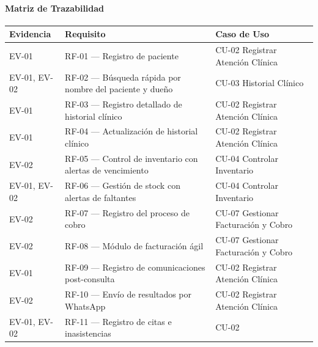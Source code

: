 \documentclass[
]{article}
\newcounter{none} %
\begin{document}
\paragraph{Matriz de Trazabilidad}\label{matriz-de-trazabilidad-1}

{\def\LTcaptype{none} %
\begin{longtable}[]{@{}
  >{\raggedright\arraybackslash}p{}
  >{\raggedright\arraybackslash}p{}
  >{\raggedright\arraybackslash}p{}@{}}
\toprule\noalign{}
\begin{minipage}[b]{\linewidth}\raggedright
\textbf{Evidencia}
\end{minipage} & \begin{minipage}[b]{\linewidth}\centering
\textbf{Requisito}
\end{minipage} & \begin{minipage}[b]{\linewidth}\raggedright
\textbf{Caso de Uso}
\end{minipage} \\
\midrule\noalign{}
\endhead
\bottomrule\noalign{}
\endlastfoot
EV-01 & RF-01 --- Registro de paciente & CU-02 Registrar Atención
Clínica \\
EV-01, EV-02 & RF-02 --- Búsqueda rápida por nombre del paciente y dueño
& CU-03 Historial Clínico \\
EV-01 & RF-03 --- Registro detallado de historial clínico & CU-02
Registrar Atención Clínica \\
EV-01 & RF-04 --- Actualización de historial clínico & CU-02 Registrar
Atención Clínica \\
EV-02 & RF-05 --- Control de inventario con alertas de vencimiento &
CU-04 Controlar Inventario \\
EV-01, EV-02 & RF-06 --- Gestión de stock con alertas de faltantes &
CU-04 Controlar Inventario \\
EV-02 & RF-07 --- Registro del proceso de cobro & CU-07 Gestionar
Facturación y Cobro \\
EV-02 & RF-08 --- Módulo de facturación ágil & CU-07 Gestionar
Facturación y Cobro \\
EV-01 & RF-09 --- Registro de comunicaciones post-consulta & CU-02
Registrar Atención Clínica \\
EV-02 & RF-10 --- Envío de resultados por WhatsApp & CU-02 Registrar
Atención Clínica \\
EV-01, EV-02 & RF-11 --- Registro de citas e inasistencias & CU-02

\end{longtable}}
\end{document}
